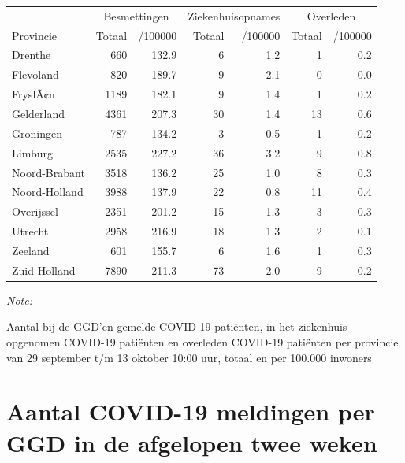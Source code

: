 \documentclass[
  english,
  man,floatsintext]{apa6}
\begin{document}
\begin{table}
\centering
\begin{threeparttable}
\begin{tabular}{lrrrrrr}
\toprule
\multicolumn{1}{c}{ } & \multicolumn{2}{c}{Besmettingen} & \multicolumn{2}{c}{Ziekenhuisopnames} & \multicolumn{2}{c}{Overleden} \\
\cmidrule(l{3pt}r{3pt}){2-3} \cmidrule(l{3pt}r{3pt}){4-5} \cmidrule(l{3pt}r{3pt}){6-7}
Provincie & Totaal & /100000 & Totaal & /100000 & Totaal & /100000\\
\midrule
Drenthe & 660 & 132.9 & 6 & 1.2 & 1 & 0.2\\
Flevoland & 820 & 189.7 & 9 & 2.1 & 0 & 0.0\\
FryslÃ¢n & 1189 & 182.1 & 9 & 1.4 & 1 & 0.2\\
Gelderland & 4361 & 207.3 & 30 & 1.4 & 13 & 0.6\\
Groningen & 787 & 134.2 & 3 & 0.5 & 1 & 0.2\\
Limburg & 2535 & 227.2 & 36 & 3.2 & 9 & 0.8\\
Noord-Brabant & 3518 & 136.2 & 25 & 1.0 & 8 & 0.3\\
Noord-Holland & 3988 & 137.9 & 22 & 0.8 & 11 & 0.4\\
Overijssel & 2351 & 201.2 & 15 & 1.3 & 3 & 0.3\\
Utrecht & 2958 & 216.9 & 18 & 1.3 & 2 & 0.1\\
Zeeland & 601 & 155.7 & 6 & 1.6 & 1 & 0.3\\
Zuid-Holland & 7890 & 211.3 & 73 & 2.0 & 9 & 0.2\\
\bottomrule
\end{tabular}
\begin{tablenotes}
\item \textit{Note: } 
\item Aantal bij de GGD’en gemelde COVID-19 patiënten, in het ziekenhuis opgenomen COVID-19 patiënten en overleden COVID-19 patiënten per provincie van 29 september t/m 13 oktober 10:00 uur, totaal en per 100.000 inwoners
\end{tablenotes}
\end{threeparttable}
\end{table}

\newpage

\hypertarget{aantal-covid-19-meldingen-per-ggd-in-de-afgelopen-twee-weken}{%
\section{Aantal COVID-19 meldingen per GGD in de afgelopen twee weken}\label{aantal-covid-19-meldingen-per-ggd-in-de-afgelopen-twee-weken}}
\end{document}
